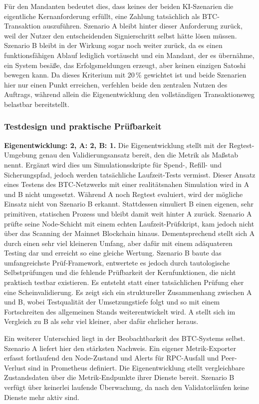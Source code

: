 Für den Mandanten bedeutet dies, dass keines der beiden \ac{KI}-Szenarien die eigentliche Kernanforderung erfüllt, eine Zahlung tatsächlich als \ac{BTC}-Transaktion auszuführen. 
Szenario A bleibt hinter dieser Anforderung zurück, weil der Nutzer den entscheidenden Signierschritt selbst hätte lösen müssen. 
Szenario B bleibt in der Wirkung sogar noch weiter zurück, da es einen funktionsfähigen Ablauf lediglich vortäuscht und ein Mandant, der es übernähme, ein System besäße, das Erfolgsmeldungen erzeugt, aber keinen einzigen Satoshi bewegen kann. Da dieses Kriterium mit 20\,\% gewichtet ist und beide Szenarien hier nur einen Punkt erreichen, verfehlen beide den zentralen Nutzen des Auftrags, während allein die Eigenentwicklung den vollständigen Transaktionsweg belastbar bereitstellt.

\subsubsection{Testdesign und praktische Prüfbarkeit}
\textbf{Eigenentwicklung: 2, A: 2, B: 1.} Die Eigenentwicklung stellt mit der Regtest-Umgebung genau den Validierungsansatz bereit, den die Metrik als Maßstab nennt. Ergänzt wird dies um Simulationsskripte für Spend-, Refill- und Sicherungspfad, jedoch werden tatsächliche Laufzeit-Tests vermisst. Dieser Ansatz eines Testens des \ac{BTC}-Netzwerks mit einer realitätsnahen Simulation wird in A und B nicht umgesetzt. Während A noch Regtest evaluiert, wird der mögliche Einsatz nicht von Szenario B erkannt. Stattdessen simuliert B einen eigenen, sehr primitiven, statischen Prozess und bleibt damit weit hinter A zurück. 
Szenario A prüfte seine Node-Schicht mit einem echten Laufzeit-Prüfskript, kam jedoch nicht über das Scanning der Mainnet Blockchain hinaus. Dementsprechend stellt sich A durch einen sehr viel kleineren Umfang, aber dafür mit einem adäquateren Testing dar und erreicht so eine gleiche Wertung.
Szenario B baute das umfangreichste Prüf-Framework, entwertete es jedoch durch tautologische Selbstprüfungen und die fehlende Prüfbarkeit der Kernfunktionen, die nicht praktisch testbar existieren. Es entsteht statt einer tatsächlichen Prüfung eher eine Scheinvalidierung.
Es zeigt sich ein struktureller Zusammenhang zwischen A und B, wobei Testqualität der Umsetzungstiefe folgt und so mit einem Fortschreiten des allgemeinen Stands weiterentwickelt wird.
A stellt sich im Vergleich zu B als sehr viel kleiner, aber dafür ehrlicher heraus.

Ein weiterer Unterschied liegt in der Beobachtbarkeit des \ac{BTC}-Systems selbst. 
Szenario A liefert hier den stärksten Nachweis. Ein eigener Metrik-Exporter erfasst fortlaufend den Node-Zustand und Alerts für \ac{RPC}-Ausfall und Peer-Verlust sind in Prometheus definiert. Die Eigenentwicklung stellt vergleichbare Zustandsdaten über die Metrik-Endpunkte
ihrer Dienste bereit. 
Szenario B verfügt über keinerlei laufende Überwachung, da nach den Validatorläufen keine Dienste mehr aktiv sind.

